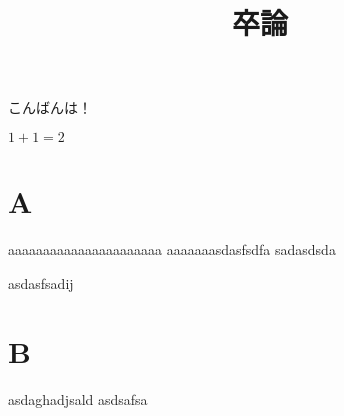 \documentclass{jsarticle}
\title{卒論}
\theoremstyle{definition}
\begin{document}
\maketitle
こんばんは！

$1 + 1 = 2$

\section{A}
aaaaaaaaaaaaaaaaaaaaaa
aaaaaaasdasfsdfa sadasdsda

asdasfsadij

\section{B}
asdaghadjsald
asdsafsa
\end{document}
